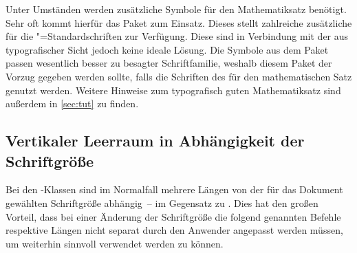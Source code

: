 \begin{DeclareEntity*}{}
\begin{DeclareEntity*}{}
\begin{DeclareEntity*}{}
\begin{Declaration}{}
\begin{Declaration}{}
\begin{Declaration}{}
\begin{Declaration}{}
\begin{Declaration}{}
\begin{Declaration}{}
\begin{Declaration}{}
\begin{Declaration}{}
\begin{Declaration}{}
\begin{Declaration}{}
\begin{Declaration}{}
\begin{Declaration}{}
\begin{Declaration}{}
\begin{Declaration}{}
\begin{Declaration}{}
\begin{Declaration}{}
\end{Declaration}
\end{Declaration}
\end{Declaration}
\end{Declaration}
\end{Declaration}
\end{Declaration}
\end{Declaration}
\end{Declaration}
\end{Declaration}
\end{Declaration}
\end{Declaration}
\end{Declaration}
\end{Declaration}
\end{Declaration}
\end{Declaration}
\end{Declaration}



Unter Umständen werden zusätzliche Symbole für den Mathematiksatz benötigt. 
Sehr oft kommt hierfür das Paket  zum Einsatz. Dieses stellt 
zahlreiche zusätzliche für die "=Standardschriften zur 
Verfügung. Diese sind in Verbindung mit der \OpenSans aus typografischer Sicht 
jedoch keine ideale Lösung. Die Symbole aus dem Paket  passen 
wesentlich besser zu besagter Schriftfamilie, weshalb diesem Paket der Vorzug 
gegeben werden sollte, falls die Schriften des \CDs für den mathematischen Satz 
genutzt werden. Weitere Hinweise zum typografisch guten Mathematiksatz sind 
außerdem in \autoref{sec:tut} zu finden.%
%



\subsection{%
  Vertikaler Leerraum in Abhängigkeit der Schriftgröße%
}

Bei den \TUDScript-Klassen sind im Normalfall mehrere Längen von der für das 
Dokument gewählten Schriftgröße abhängig~-- im Gegensatz zu \KOMAScript. Dies 
hat den großen Vorteil, dass bei einer Änderung der Schriftgröße die folgend 
genannten Befehle respektive Längen nicht separat durch den Anwender angepasst 
werden müssen, um weiterhin sinnvoll verwendet werden zu können.


\end{DeclareEntity*}
\end{DeclareEntity*}
\end{DeclareEntity*}
